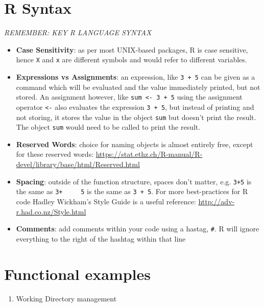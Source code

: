 \documentclass[]{book}
\providecommand{\tightlist}{%
  \setlength{\itemsep}{0pt}\setlength{\parskip}{0pt}}
\begin{document}
\hypertarget{r-syntax}{%
\section{R Syntax}\label{r-syntax}}

\emph{REMEMBER: KEY R LANGUAGE SYNTAX}

\begin{itemize}
\tightlist
\item
  \textbf{Case Sensitivity}: as per most UNIX-based packages, R is case sensitive, hence \texttt{X} and \texttt{x} are different symbols and would refer to different variables.\\
\item
  \textbf{Expressions vs Assignments}: an expression, like \texttt{3\ +\ 5} can be given as a command which will be evaluated and the value immediately printed, but not stored. An assignment however, like \texttt{sum\ \textless{}-\ 3\ +\ 5} using the assignment operator \texttt{\textless{}-} also evaluates the expression \texttt{3\ +\ 5}, but instead of printing and not storing, it stores the value in the object \texttt{sum} but doesn't print the result. The object \texttt{sum} would need to be called to print the result.\\
\item
  \textbf{Reserved Words}: choice for naming objects is almost entirely free, except for these reserved words: \url{https://stat.ethz.ch/R-manual/R-devel/library/base/html/Reserved.html}\\
\item
  \textbf{Spacing}: outside of the function structure, spaces don't matter, e.g. \texttt{3+5} is the same as \texttt{3+\ \ \ \ \ 5} is the same as \texttt{3\ +\ 5}. For more best-practices for R code Hadley Wickham's Style Guide is a useful reference: \url{http://adv-r.had.co.nz/Style.html}
\item
  \textbf{Comments}: add comments within your code using a hastag, \texttt{\#}. R will ignore everything to the right of the hashtag within that line
\end{itemize}

\hypertarget{functional-examples}{%
\section{Functional examples}\label{functional-examples}}

\begin{enumerate}
\def\labelenumi{\arabic{enumi}.}
\tightlist
\item
  Working Directory management
\end{enumerate}
\end{document}
